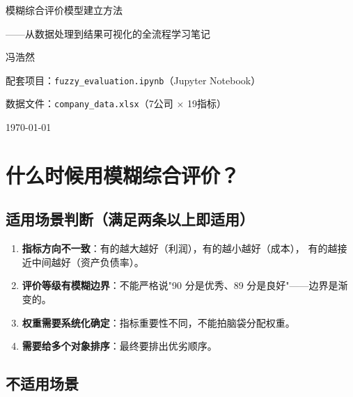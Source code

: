 \documentclass[a4paper,11pt]{ctexart}
\begin{document}
\begin{center}
\vspace*{2cm}
{\heiti\Huge 模糊综合评价模型建立方法}

\vspace{0.8cm}
{\kaishu\Large ——从数据处理到结果可视化的全流程学习笔记}

\vspace{1.5cm}
{\kaishu\large 冯浩然}

\vspace{0.5cm}
{\songti\small 配套项目：\texttt{fuzzy\_evaluation.ipynb}（Jupyter Notebook）}

\vspace{0.3cm}
{\songti\small 数据文件：\texttt{company\_data.xlsx}（7公司 $\times$ 19指标）}

\vfill
{\songti\small \today}
\end{center}
\thispagestyle{empty}
\newpage

\tableofcontents
\newpage

\section{什么时候用模糊综合评价？}

\subsection{适用场景判断（满足两条以上即适用）}

\begin{enumerate}
    \item \textbf{指标方向不一致}：有的越大越好（利润），有的越小越好（成本），
          有的越接近中间越好（资产负债率）。
    \item \textbf{评价等级有模糊边界}：不能严格说"90 分是优秀、89 分是良好"——边界是渐变的。
    \item \textbf{权重需要系统化确定}：指标重要性不同，不能拍脑袋分配权重。
    \item \textbf{需要给多个对象排序}：最终要排出优劣顺序。
\end{enumerate}

\subsection{不适用场景}
\end{document}
